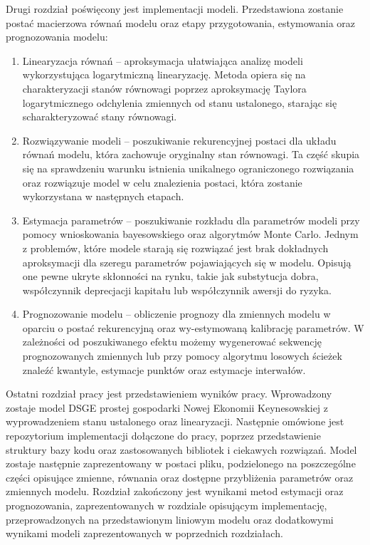 Drugi rozdział poświęcony jest implementacji modeli. Przedstawiona zostanie postać macierzowa równań modelu oraz etapy przygotowania, estymowania oraz prognozowania modelu:
\begin{enumerate}
    \item Linearyzacja równań -- aproksymacja ułatwiająca analizę modeli wykorzystująca logarytmiczną linearyzację. Metoda opiera się na charakteryzacji stanów równowagi poprzez aproksymację Taylora logarytmicznego odchylenia zmiennych od stanu ustalonego, starając się scharakteryzować stany równowagi.
    \item Rozwiązywanie modeli -- poszukiwanie rekurencyjnej postaci dla układu równań modelu, która zachowuje oryginalny stan równowagi. Ta część skupia się na sprawdzeniu warunku istnienia unikalnego ograniczonego rozwiązania oraz rozwiązuje model w celu znalezienia postaci, która zostanie wykorzystana w następnych etapach.
    \item Estymacja parametrów -- poszukiwanie rozkładu dla parametrów modeli przy pomocy wnioskowania bayesowskiego oraz algorytmów Monte Carlo. Jednym z problemów, które modele starają się rozwiązać jest brak dokładnych aproksymacji dla szeregu parametrów pojawiających się w modelu. Opisują one pewne ukryte skłonności na rynku, takie jak substytucja dobra, współczynnik deprecjacji kapitału lub współczynnik awersji do ryzyka. 
    \item Prognozowanie modelu -- obliczenie prognozy dla zmiennych modelu w oparciu o postać rekurencyjną oraz wy-estymowaną kalibrację parametrów. W zależności od poszukiwanego efektu możemy wygenerować sekwencję prognozowanych zmiennych lub przy pomocy algorytmu losowych ścieżek znaleźć kwantyle, estymacje punktów oraz estymacje interwałów.
\end{enumerate}

Ostatni rozdział pracy jest przedstawieniem wyników pracy. Wprowadzony zostaje model DSGE prostej gospodarki Nowej Ekonomii Keynesowskiej z wyprowadzeniem stanu ustalonego oraz linearyzacji. Następnie omówione jest repozytorium implementacji dołączone do pracy, poprzez przedstawienie struktury bazy kodu oraz zastosowanych bibliotek i ciekawych rozwiązań. Model zostaje następnie zaprezentowany w postaci pliku, podzielonego na poszczególne części opisujące zmienne, równania oraz dostępne przybliżenia parametrów oraz zmiennych modelu. Rozdział zakończony jest wynikami metod estymacji oraz prognozowania, zaprezentowanych w rozdziale opisującym implementację, przeprowadzonych na przedstawionym liniowym modelu oraz dodatkowymi wynikami modeli zaprezentowanych w poprzednich rozdziałach.